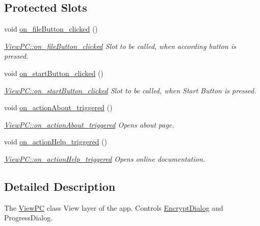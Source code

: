 \subsection*{Protected Slots}
\begin{DoxyCompactItemize}
\item 
void \mbox{\hyperlink{class_view_p_c_a3b9b7a7be9702d8b160f257f1c74a776}{on\+\_\+file\+Button\+\_\+clicked}} ()
\begin{DoxyCompactList}\small\item\em \mbox{\hyperlink{class_view_p_c_a3b9b7a7be9702d8b160f257f1c74a776}{View\+P\+C\+::on\+\_\+file\+Button\+\_\+clicked}} Slot to be called, when according button is pressed. \end{DoxyCompactList}\item 
void \mbox{\hyperlink{class_view_p_c_a456d75b7c5d3a089302a576e7359f1f4}{on\+\_\+start\+Button\+\_\+clicked}} ()
\begin{DoxyCompactList}\small\item\em \mbox{\hyperlink{class_view_p_c_a456d75b7c5d3a089302a576e7359f1f4}{View\+P\+C\+::on\+\_\+start\+Button\+\_\+clicked}} Slot to be called, when Start Button is pressed. \end{DoxyCompactList}\item 
void \mbox{\hyperlink{class_view_p_c_a09a46da4d492eb3dde88f35dc58c997b}{on\+\_\+action\+About\+\_\+triggered}} ()
\begin{DoxyCompactList}\small\item\em \mbox{\hyperlink{class_view_p_c_a09a46da4d492eb3dde88f35dc58c997b}{View\+P\+C\+::on\+\_\+action\+About\+\_\+triggered}} Opens about page. \end{DoxyCompactList}\item 
void \mbox{\hyperlink{class_view_p_c_a0d252ff4829260c6c76769fbd24b7cd7}{on\+\_\+action\+Help\+\_\+triggered}} ()
\begin{DoxyCompactList}\small\item\em \mbox{\hyperlink{class_view_p_c_a0d252ff4829260c6c76769fbd24b7cd7}{View\+P\+C\+::on\+\_\+action\+Help\+\_\+triggered}} Opens online documentation. \end{DoxyCompactList}\end{DoxyCompactItemize}


\subsection{Detailed Description}
The \mbox{\hyperlink{class_view_p_c}{View\+PC}} class View layer of the app. Controls \mbox{\hyperlink{class_encrypt_dialog}{Encrypt\+Dialog}} and Progress\+Dialog. 

